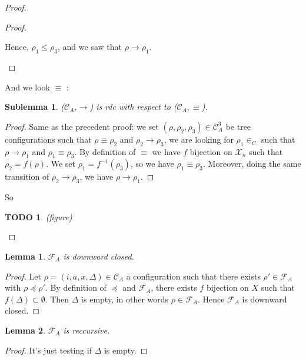 \documentclass[a4paper,10pt]{report}
\newtheorem{lm}{Lemma}[thr]
\newtheorem{slm}{Sublemma}[lm]
\newtheorem{td}{TODO}
\newcommand{\C}{\mathcal{C}_{A}}
\newcommand{\F}{\mathcal{F}_{A}}
\newcommand{\X}{\mathcal{X}_{n}}
\begin{document}
\begin{proof}
\begin{proof}
\begin{itemize}
     Hence, $\rho_1 \leq \rho_3$, and we saw that $\rho \rightarrow \rho_1$.
   \end{itemize}   
  \end{proof}
  And we look $\equiv$ :
  \begin{slm}
    ($\C$,$\rightarrow$) is rdc with respect to ($\C,\equiv$).
  \end{slm}
  \begin{proof}
    Same as the precedent proof: we set $(\rho, \rho_2  , \rho_3) \in \C^3 $ be tree configurations 
   such that $\rho \equiv \rho_2$ and $\rho_2 \rightarrow \rho_3$, we are looking for $\rho_1 \in _C$ such that $\rho \rightarrow \rho_1$  and $\rho_1 \equiv \rho_3$.
   By definition of $\equiv$ we have $f$ bijection on $\X$ such that $\rho_2 = f(\rho)$. We set $\rho_1 = f^{-1}(\rho_3)$, so we have $\rho_1 \equiv \rho_3$.
   Moreover, doing the same transition of $\rho_2 \rightarrow \rho_3$, we have $\rho \rightarrow \rho_1$.    
  \end{proof}
   So 
   \begin{td}
      (figure)
  
   \end{td}

  
\end{proof}


\begin{lm} \label{cd5}
  $\F$ is downward closed. 
\end{lm}
\begin{proof}
  Let $\rho=(i,a,x,\Delta) \in \C$ a configuration such that there exists $\rho' \in \F$ with $\rho \preceq \rho'$.
  By definition of $\preceq$ and $\F$, there exists $f$ bijection on $X$ such that $f(\Delta) \subset \emptyset$.
  Then $\Delta$ is empty, in other words $\rho \in \F$.
  Hence $\F$ is downward closed. 
\end{proof}

\begin{lm} \label{cd6}
  $\F$ is reccursive.
\end{lm}

\begin{proof}
  It's just testing if $\Delta$ is empty.
\end{proof}
\end{document}
